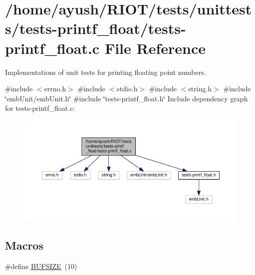 \hypertarget{tests-printf__float_8c}{}\section{/home/ayush/\+R\+I\+O\+T/tests/unittests/tests-\/printf\+\_\+float/tests-\/printf\+\_\+float.c File Reference}
\label{tests-printf__float_8c}


Implementations of unit tests for printing floating point numbers.  


{\ttfamily \#include $<$errno.\+h$>$}\newline
{\ttfamily \#include $<$stdio.\+h$>$}\newline
{\ttfamily \#include $<$string.\+h$>$}\newline
{\ttfamily \#include \char`\"{}emb\+Unit/emb\+Unit.\+h\char`\"{}}\newline
{\ttfamily \#include \char`\"{}tests-\/printf\+\_\+float.\+h\char`\"{}}\newline
Include dependency graph for tests-\/printf\+\_\+float.c\+:
\nopagebreak
\begin{figure}[H]
\begin{center}
\leavevmode
\includegraphics[width=350pt]{tests-printf__float_8c__incl}
\end{center}
\end{figure}
\subsection*{Macros}
\begin{DoxyCompactItemize}
\item 
\#define \hyperlink{tests-printf__float_8c_aeca034f67218340ecb2261a22c2f3dcd}{B\+U\+F\+S\+I\+ZE}~(10)
\end{DoxyCompactItemize}
